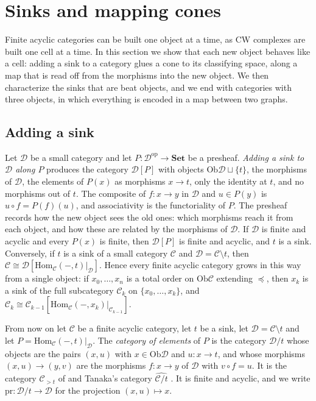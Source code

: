\documentclass[12pt]{amsart}
\theoremstyle{definition}
\theoremstyle{remark}
\newcommand{\CC}{\mathcal{C}}
\newcommand{\DD}{\mathcal{D}}
\newcommand{\co}{\colon}
\newcommand{\Hom}{\mathrm{Hom}}
\newcommand{\Ob}{\mathrm{Ob}}
\newcommand{\op}{\mathrm{op}}
\begin{document}
\section{Sinks and mapping cones}\label{sec:sink}

Finite acyclic categories can be built one object at a time, as CW complexes are built one cell at a time. In this section we show that each new object behaves like a cell: adding a sink to a category glues a cone to its classifying space, along a map that is read off from the morphisms into the new object. We then characterize the sinks that are beat objects, and we end with categories with three objects, in which everything is encoded in a map between two graphs.

\subsection{Adding a sink}\label{subsec:add-sink}

Let $\DD$ be a small category and let $P\co\DD^{\op}\to\mathbf{Set}$ be a presheaf. \emph{Adding a sink to $\DD$ along $P$} produces the category $\DD[P]$ with objects $\Ob\DD\sqcup\{t\}$, the morphisms of $\DD$, the elements of $P(x)$ as morphisms $x\to t$, only the identity at $t$, and no morphisms out of $t$. The composite of $f\co x\to y$ in $\DD$ and $u\in P(y)$ is $u\circ f=P(f)(u)$, and associativity is the functoriality of $P$. The presheaf records how the new object sees the old ones: which morphisms reach it from each object, and how these are related by the morphisms of $\DD$. If $\DD$ is finite and acyclic and every $P(x)$ is finite, then $\DD[P]$ is finite and acyclic, and $t$ is a sink. Conversely, if $t$ is a sink of a small category $\CC$ and $\DD=\CC\setminus t$, then $\CC\cong\DD[\Hom_\CC(-,t)|_\DD]$. Hence every finite acyclic category grows in this way from a single object: if $x_0,\dots,x_n$ is a total order on $\Ob\CC$ extending $\preceq$, then $x_k$ is a sink of the full subcategory $\CC_k$ on $\{x_0,\dots,x_k\}$, and $\CC_k\cong\CC_{k-1}[\Hom_\CC(-,x_k)|_{\CC_{k-1}}]$.

From now on let $\CC$ be a finite acyclic category, let $t$ be a sink, let $\DD=\CC\setminus t$ and let $P=\Hom_\CC(-,t)|_\DD$. The \emph{category of elements} of $P$ is the category $\DD/t$ whose objects are the pairs $(x,u)$ with $x\in\Ob\DD$ and $u\co x\to t$, and whose morphisms $(x,u)\to(y,v)$ are the morphisms $f\co x\to y$ of $\DD$ with $v\circ f=u$. It is the category $\CC_{>t}$ of \cite[Section~10.3.3]{Kozlov2008} and Tanaka's category $\widehat{\CC/t}$ \cite[Section~2]{Tanaka2019}. It is finite and acyclic, and we write $\mathrm{pr}\co\DD/t\to\DD$ for the projection $(x,u)\mapsto x$.
\end{document}
